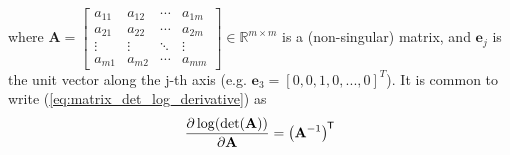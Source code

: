 \documentclass{article}
\newcommand{\real}{\mathbb{R}}
\newcommand*{\tran}{^{\mkern-1.5mu\mathsf{T}}}
\def\matA{{\mathbf A}}
\def\real{{\mathbb {R}}}
\begin{document}
\begin{enumerate}
\begin{equation}
    \end{equation}
    where $\boldsymbol{\matA} = \left[\begin{array}{cccc}
    a_{11} & a_{12} & \cdots & a_{1 m} \\
    a_{21} & a_{22} & \cdots & a_{2 m} \\
    \vdots & \vdots & \ddots & \vdots \\
    a_{m 1} & a_{m 2} & \cdots & a_{m m}
    \end{array}\right]
     \in \real^{m\times m}$ is a (non-singular) matrix, and $\mathbf{e}_j$ is the unit vector along the j-th axis (e.g. $\mathbf{e}_3=[0,0,1,0,...,0]^T$).
     It is common to write (\ref{eq:matrix_det_log_derivative}) as
     $$\frac{\partial \log(\det(\matA))}{\partial \matA} =  \left(\matA^{-1}\right)\tran$$
\end{enumerate}
\end{document}
